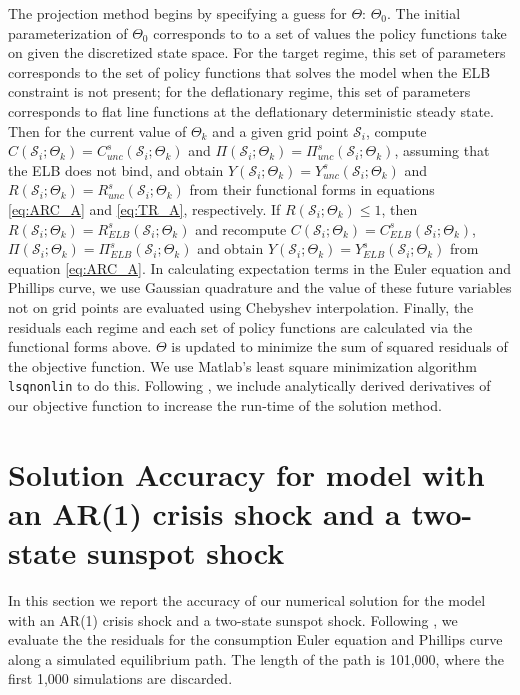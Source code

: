 \documentclass[11pt]{article}
\begin{document}
\begin{singlespace}
	The projection method begins by specifying a guess for $\Theta$: $\Theta_0$. The initial parameterization of $\Theta_0$ corresponds to to a set of values the policy functions take on given the discretized state space. For the target regime, this set of parameters corresponds to the set of policy functions that solves the model when the ELB constraint is not present; for the deflationary regime, this set of parameters corresponds to flat line functions at the deflationary deterministic steady state. Then for the current value of $\Theta_k$ and a given grid point $\mathcal{S}_i$, compute $C(\mathcal{S}_{i};\Theta_{k}) = C_{unc}^s(\mathcal{S}_{i};\Theta_{k})$ and $\Pi(\mathcal{S}_{i};\Theta_{k}) = \Pi_{unc}^s(\mathcal{S}_{i};\Theta_{k})$, assuming that the ELB does not bind, and obtain $Y(\mathcal{S}_{i};\Theta_{k}) = Y_{unc}^s(\mathcal{S}_{i};\Theta_{k})$ and $R(\mathcal{S}_{i};\Theta_{k}) = R_{unc}^s(\mathcal{S}_{i};\Theta_{k})$ from their functional forms in equations \ref{eq:ARC_A} and \ref{eq:TR_A}, respectively. If $R(\mathcal{S}_{i};\Theta_{k})\le 1$, then $R(\mathcal{S}_{i};\Theta_{k}) = R_{ELB}^s(\mathcal{S}_{i};\Theta_{k})$ and recompute $C(\mathcal{S}_{i};\Theta_{k}) = C_{ELB}^s(\mathcal{S}_{i};\Theta_{k})$, $\Pi(\mathcal{S}_{i};\Theta_{k}) = \Pi_{ELB}^s(\mathcal{S}_{i};\Theta_{k})$ and obtain $Y(\mathcal{S}_{i};\Theta_{k}) = Y_{ELB}^s(\mathcal{S}_{i};\Theta_{k})$ from equation \ref{eq:ARC_A}. In calculating expectation terms in the Euler equation and Phillips curve, we use Gaussian quadrature and the value of these future variables not on grid points are evaluated using Chebyshev interpolation. Finally, the residuals each regime and each set of policy functions are calculated via the functional forms above. $\Theta$ is updated to minimize the sum of squared residuals of the objective function. We use Matlab's least square minimization algorithm \texttt{lsqnonlin}  to do this. Following \citet{AruobaCubaBordaSchorfheide2018}, we include analytically derived derivatives of our objective function to increase the run-time of the solution method.

	\section{Solution Accuracy for model with an AR(1) crisis shock and a two-state sunspot shock}
	\label{A:SolutionAccuracy}

	In this section we report the accuracy of our numerical solution for the model with an AR(1) crisis shock and a two-state sunspot shock. Following \citet{MaliarMaliar2015}, we evaluate the the residuals for the consumption Euler equation and Phillips curve along a simulated equilibrium path. The length of the path is 101,000, where the first 1,000 simulations are discarded.


\end{singlespace}
\end{document}
